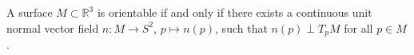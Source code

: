 A surface $M \subset \mathbb{R}^3$ is orientable if and only if there exists a continuous unit normal vector field $n: M \to S^2$, $p \mapsto n(p)$, such that $n(p) \perp T_p M$ for all $p \in M$.